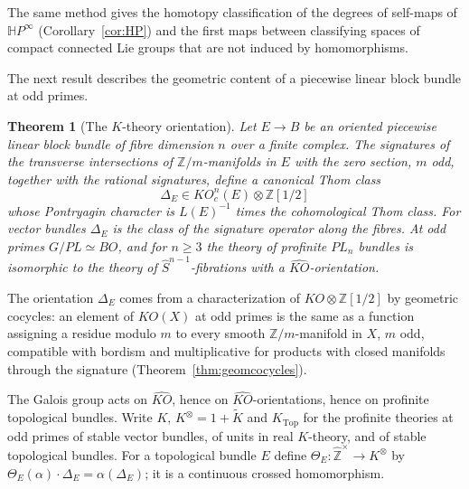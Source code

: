 \documentclass[11pt]{amsart}
\theoremstyle{plain}
\newtheorem{theoremA}{Theorem}
\theoremstyle{definition}
\numberwithin{equation}{section}
\newcommand{\Z}{\mathbb{Z}}
\newcommand{\Zhat}{\widehat{\mathbb{Z}}}
\newcommand{\HP}{\mathbb{H}P}
\newcommand{\KO}{\mathit{KO}}
\newcommand{\Ktop}{K_{\mathrm{Top}}}
\newcommand{\units}{^{\times}}
\begin{document}
The same method gives the homotopy classification of the degrees of self-maps of $\HP^\infty$ (Corollary~\ref{cor:HP}) and the first maps between classifying spaces of compact connected Lie groups that are not induced by homomorphisms.

The next result describes the geometric content of a piecewise linear block bundle at odd primes.

\begin{theoremA}[The $K$-theory orientation]\label{thm:D}
Let $E\to B$ be an oriented piecewise linear block bundle of fibre dimension $n$ over a finite complex.
The signatures of the transverse intersections of $\Z/m$-manifolds in $E$ with the zero section, $m$ odd, together with the rational signatures, define a canonical Thom class
\[
\Delta_E\in\KO^n_c(E)\otimes\Z[1/2]
\]
whose Pontryagin character is $L(E)^{-1}$ times the cohomological Thom class.
For vector bundles $\Delta_E$ is the class of the signature operator along the fibres.
At odd primes $G/PL\simeq BO$, and for $n\ge3$ the theory of profinite $PL_n$ bundles is isomorphic to the theory of $\widehat S^{n-1}$-fibrations with a $\widehat{\KO}$-orientation.
\end{theoremA}

The orientation $\Delta_E$ comes from a characterization of $\KO\otimes\Z[1/2]$ by geometric cocycles: an element of $\widehat{\KO}(X)$ at odd primes is the same as a function assigning a residue modulo $m$ to every smooth $\Z/m$-manifold in $X$, $m$ odd, compatible with bordism and multiplicative for products with closed manifolds through the signature (Theorem~\ref{thm:geomcocycles}).

The Galois group acts on $\widehat{\KO}$, hence on $\widehat{\KO}$-orientations, hence on profinite topological bundles.
Write $K$, $K^\otimes=1+\widetilde K$ and $\Ktop$ for the profinite theories at odd primes of stable vector bundles, of units in real $K$-theory, and of stable topological bundles.
For a topological bundle $E$ define $\Theta_E\colon\Zhat\units\to K^\otimes$ by $\Theta_E(\alpha)\cdot\Delta_E=\alpha(\Delta_E)$; it is a continuous crossed homomorphism.
\end{document}
